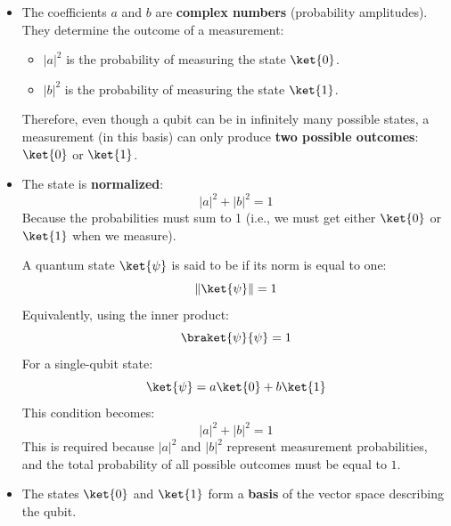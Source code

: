 \begin{itemize}
    \item The coefficients $a$ and $b$ are \textbf{complex numbers} (probability amplitudes). They determine the outcome of a measurement:
    \begin{itemize}
        \item $\left|a\right|^2$ is the probability of measuring the state $\ket{0}$.
        \item $\left|b\right|^2$ is the probability of measuring the state $\ket{1}$.
    \end{itemize}
    Therefore, even though a qubit can be in infinitely many possible states, a measurement (in this basis) can only produce \textbf{two possible outcomes}: $\ket{0}$ or $\ket{1}$.
    
    \item The state is \textbf{normalized}:
    \begin{equation*}
        \left|a\right|^2 + \left|b\right|^2 = 1
    \end{equation*}
    Because the probabilities must sum to 1 (i.e., we must get either $\ket{0}$ or $\ket{1}$ when we measure).
    \begin{definitionbox}\label{def:normalized-quantum-state}
        A quantum state $\ket{\psi}$ is said to be  if its norm is equal to one:
        \begin{equation*}
            \left\|\ket{\psi}\right\| = 1
        \end{equation*}
        Equivalently, using the inner product:
        \begin{equation*}
            \braket{\psi}{\psi} = 1
        \end{equation*}
        For a single-qubit state:
        \begin{equation*}
            \ket{\psi} = a\ket{0} + b\ket{1}
        \end{equation*}
        This condition becomes:
        \begin{equation}
            |a|^2 + |b|^2 = 1
        \end{equation}
        This is required because $|a|^2$ and $|b|^2$ represent measurement probabilities, and the total probability of all possible outcomes must be equal to $1$.
    \end{definitionbox}

    \item The states $\ket{0}$ and $\ket{1}$ form a \textbf{basis} of the vector space describing the qubit.


\end{itemize}
